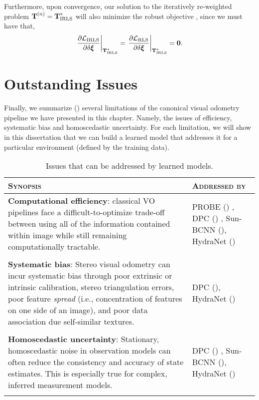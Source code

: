 Furthermore, upon convergence, our solution to the iteratively re-weighted problem $\boldsymbol{\mathbf{T}}^{(n)} = \boldsymbol{\mathbf{T}}_\text{IRLS}^*$ will also minimize the robust objective , since we must have that,
\begin{equation}
	\left.\dfrac{\partial \mathcal{L}_{\text{IRLS}}}{\partial \delta \boldsymbol{\mathbf{\xi}}}\right|_{\boldsymbol{\mathbf{T}}_\text{IRLS}^*} = \left.\dfrac{\partial \mathcal{L}_{\text{RLS}}}{\partial \delta \boldsymbol{\mathbf{\xi}}}\right|_{\boldsymbol{\mathbf{T}}_\text{IRLS}^*} = \boldsymbol{\mathbf{0}}.
\end{equation}
 



\newpage
\section{Outstanding Issues}
Finally, we summarize () several limitations of the canonical visual odometry pipeline we have presented in this chapter. Namely, the issues of efficiency, systematic bias and homoscedastic uncertainty. For each limitation, we will show in this dissertation that we can build a learned model that addresses it for a particular environment (defined by the training data).

\begin{table}[h!]
	\caption{Issues that can be addressed by learned models.}	\begin{threeparttable}
	\begin{tabular}{m{}m{}}
		\toprule
		\textsc{Synopsis} & \textsc{Addressed by} \\ \midrule  
		\textbf{Computational efficiency}: classical VO pipelines face a difficult-to-optimize trade-off between using all of the information contained within image while still remaining computationally tractable.  & PROBE (\Cref{ch:probe}) , DPC (\Cref{ch:dpc}) , Sun-BCNN (\Cref{ch:sun-bcnn}), HydraNet (\Cref{ch:hydranet}) \\
		& \\
		\textbf{Systematic bias}: Stereo visual odometry can incur systematic bias through poor extrinsic or intrinsic calibration, stereo triangulation errors, poor feature \textit{spread} (i.e., concentration of features on one side of an image), and poor data association due self-similar textures. &  DPC (\Cref{ch:dpc}), HydraNet (\Cref{ch:hydranet}) \\
		& \\
		\textbf{Homoscedastic uncertainty}: Stationary, homoscedastic noise in observation models can often reduce the consistency and accuracy of state estimates. This is especially true for complex, inferred measurement models. &  DPC (\Cref{ch:dpc}) , Sun-BCNN (\Cref{ch:sun-bcnn}), HydraNet (\Cref{ch:hydranet})\\
		& \\
		\bottomrule
	\end{tabular}
	\label{tab:vo_outstanding_issues}
\end{threeparttable}
\end{table}


